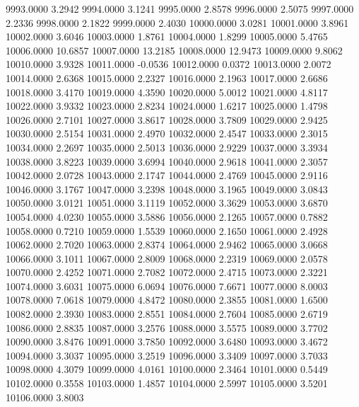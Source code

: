 9993.0000      3.2942
9994.0000      3.1241
9995.0000      2.8578
9996.0000      2.5075
9997.0000      2.2336
9998.0000      2.1822
9999.0000      2.4030
10000.0000      3.0281
10001.0000      3.8961
10002.0000      3.6046
10003.0000      1.8761
10004.0000      1.8299
10005.0000      5.4765
10006.0000     10.6857
10007.0000     13.2185
10008.0000     12.9473
10009.0000      9.8062
10010.0000      3.9328
10011.0000     -0.0536
10012.0000      0.0372
10013.0000      2.0072
10014.0000      2.6368
10015.0000      2.2327
10016.0000      2.1963
10017.0000      2.6686
10018.0000      3.4170
10019.0000      4.3590
10020.0000      5.0012
10021.0000      4.8117
10022.0000      3.9332
10023.0000      2.8234
10024.0000      1.6217
10025.0000      1.4798
10026.0000      2.7101
10027.0000      3.8617
10028.0000      3.7809
10029.0000      2.9425
10030.0000      2.5154
10031.0000      2.4970
10032.0000      2.4547
10033.0000      2.3015
10034.0000      2.2697
10035.0000      2.5013
10036.0000      2.9229
10037.0000      3.3934
10038.0000      3.8223
10039.0000      3.6994
10040.0000      2.9618
10041.0000      2.3057
10042.0000      2.0728
10043.0000      2.1747
10044.0000      2.4769
10045.0000      2.9116
10046.0000      3.1767
10047.0000      3.2398
10048.0000      3.1965
10049.0000      3.0843
10050.0000      3.0121
10051.0000      3.1119
10052.0000      3.3629
10053.0000      3.6870
10054.0000      4.0230
10055.0000      3.5886
10056.0000      2.1265
10057.0000      0.7882
10058.0000      0.7210
10059.0000      1.5539
10060.0000      2.1650
10061.0000      2.4928
10062.0000      2.7020
10063.0000      2.8374
10064.0000      2.9462
10065.0000      3.0668
10066.0000      3.1011
10067.0000      2.8009
10068.0000      2.2319
10069.0000      2.0578
10070.0000      2.4252
10071.0000      2.7082
10072.0000      2.4715
10073.0000      2.3221
10074.0000      3.6031
10075.0000      6.0694
10076.0000      7.6671
10077.0000      8.0003
10078.0000      7.0618
10079.0000      4.8472
10080.0000      2.3855
10081.0000      1.6500
10082.0000      2.3930
10083.0000      2.8551
10084.0000      2.7604
10085.0000      2.6719
10086.0000      2.8835
10087.0000      3.2576
10088.0000      3.5575
10089.0000      3.7702
10090.0000      3.8476
10091.0000      3.7850
10092.0000      3.6480
10093.0000      3.4672
10094.0000      3.3037
10095.0000      3.2519
10096.0000      3.3409
10097.0000      3.7033
10098.0000      4.3079
10099.0000      4.0161
10100.0000      2.3464
10101.0000      0.5449
10102.0000      0.3558
10103.0000      1.4857
10104.0000      2.5997
10105.0000      3.5201
10106.0000      3.8003
